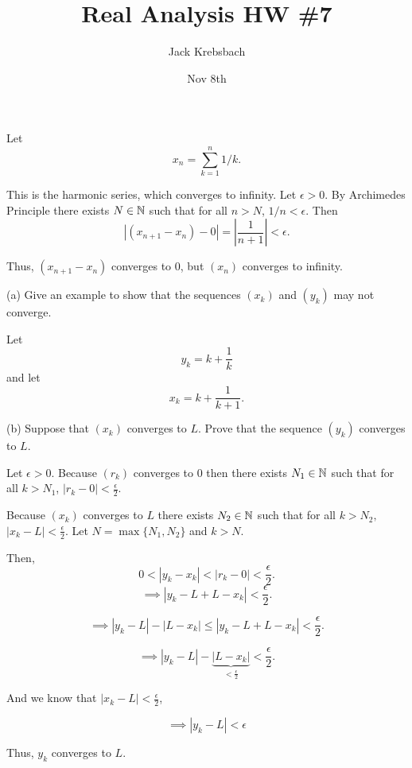\documentclass{report}
\title{Real Analysis HW \#7}
\author{Jack Krebsbach }
\date{Nov 8th}
\begin{document}
\maketitle
{}

\sol
Let $$x_n= \sum_{k=1}^{n} 1/k.$$

This is the harmonic series, which converges to infinity. Let $\epsilon>0.$ By Archimedes Principle there exists $N \in \NN$ such that for all $n>N$, $1/n < \epsilon.$ Then $$|(x_{n+1} - x_n) -0 | = \left|\frac{1}{n+1}\right| <\epsilon.$$

Thus, $\left(x_{n+1}-x_n\right)$ converges to 0, but $(x_n)$ converges to infinity.

\bigskip
{}

\bigskip
(a) Give an example to show that the sequences $\left(x_k\right)$ and $\left(y_k\right)$ may not converge.
\bigskip

\sol
Let $$y_k = k + \frac{1}{k}$$ and let $$x_k = k +\frac{1}{k+1}.$$

\bigskip
\bigskip
\bigskip
(b) Suppose that $\left(x_k\right)$ converges to $L$. Prove that the sequence $\left(y_k\right)$ converges to $L$.

\begin{myproof}
    Let $\epsilon >0.$ Because $(r_k)$ converges to $0$ then there exists $N_1 \in \NN$ such that for all $k>N_1$, $\left|r_k - 0 \right| < \frac{\epsilon}{2}.$

    Because $(x_k)$ converges to $L$ there exists $N_2 \in \NN$ such that for all $k>N_2,$ $\left| x_k -L\right| < \frac{\epsilon}{2}.$ Let $N = \max\{N_1,N_2\}$ and $k> N.$

    Then, $$0 < \left| y_k - x_k \right| < \left|r_k -0\right| < \frac{\epsilon}{2}.$$
$$\implies \left| y_k - L + L - x_k \right| < \frac{\epsilon}{2}.$$

$$\implies \left| y_k - L\right|  - \left|L - x_k \right| \leq \left| y_k - L + L - x_k \right|< \frac{\epsilon}{2}.$$

$$\implies \left| y_k - L\right|  - \underbrace{\left|L - x_k \right|}_{< \frac{\epsilon}{2}} < \frac{\epsilon}{2}.$$

And we know that $\left| x_k -L\right| < \frac{\epsilon}{2}$,

$$\implies \left| y_k - L\right| < \epsilon$$

Thus, $y_k$ converges to $L.$
\end{myproof}
\end{document}
